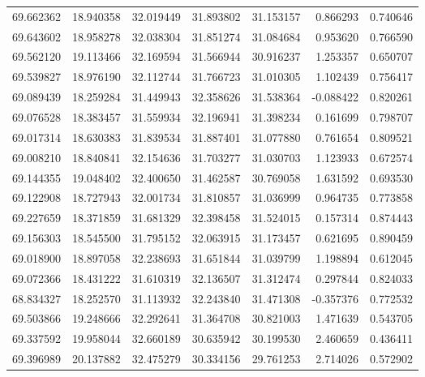 \begin{tabular}{rrrrrrr}
 69.662362 &  18.940358 &         32.019449 &         31.893802 &         31.153157 &  0.866293 &  0.740646 \\
 69.643602 &  18.958278 &         32.038304 &         31.851274 &         31.084684 &  0.953620 &  0.766590 \\
 69.562120 &  19.113466 &         32.169594 &         31.566944 &         30.916237 &  1.253357 &  0.650707 \\
 69.539827 &  18.976190 &         32.112744 &         31.766723 &         31.010305 &  1.102439 &  0.756417 \\
 69.089439 &  18.259284 &         31.449943 &         32.358626 &         31.538364 & -0.088422 &  0.820261 \\
 69.076528 &  18.383457 &         31.559934 &         32.196941 &         31.398234 &  0.161699 &  0.798707 \\
 69.017314 &  18.630383 &         31.839534 &         31.887401 &         31.077880 &  0.761654 &  0.809521 \\
 69.008210 &  18.840841 &         32.154636 &         31.703277 &         31.030703 &  1.123933 &  0.672574 \\
 69.144355 &  19.048402 &         32.400650 &         31.462587 &         30.769058 &  1.631592 &  0.693530 \\
 69.122908 &  18.727943 &         32.001734 &         31.810857 &         31.036999 &  0.964735 &  0.773858 \\
 69.227659 &  18.371859 &         31.681329 &         32.398458 &         31.524015 &  0.157314 &  0.874443 \\
 69.156303 &  18.545500 &         31.795152 &         32.063915 &         31.173457 &  0.621695 &  0.890459 \\
 69.018900 &  18.897058 &         32.238693 &         31.651844 &         31.039799 &  1.198894 &  0.612045 \\
 69.072366 &  18.431222 &         31.610319 &         32.136507 &         31.312474 &  0.297844 &  0.824033 \\
 68.834327 &  18.252570 &         31.113932 &         32.243840 &         31.471308 & -0.357376 &  0.772532 \\
 69.503866 &  19.248666 &         32.292641 &         31.364708 &         30.821003 &  1.471639 &  0.543705 \\
 69.337592 &  19.958044 &         32.660189 &         30.635942 &         30.199530 &  2.460659 &  0.436411 \\
 69.396989 &  20.137882 &         32.475279 &         30.334156 &         29.761253 &  2.714026 &  0.572902 \\

\end{tabular}
